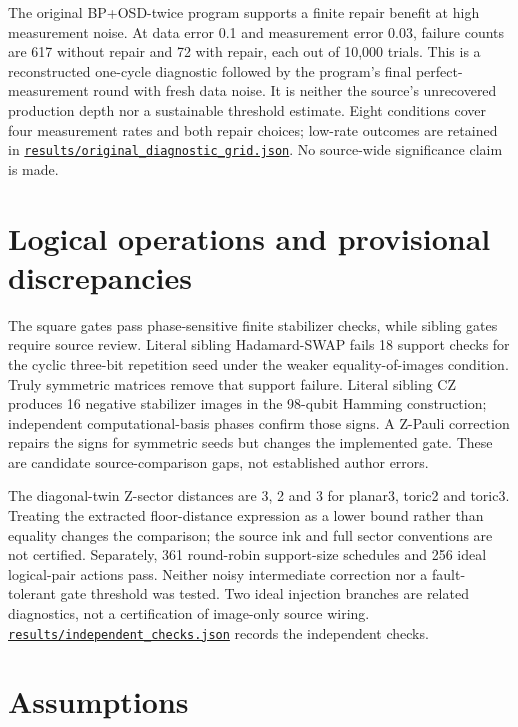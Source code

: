 \documentclass[11pt]{article}
\begin{document}
The original BP+OSD-twice program supports a finite repair benefit at high measurement noise. At data error 0.1 and measurement error 0.03, failure counts are 617 without repair and 72 with repair, each out of 10,000 trials. This is a reconstructed one-cycle diagnostic followed by the program's final perfect-measurement round with fresh data noise. It is neither the source's unrecovered production depth nor a sustainable threshold estimate. Eight conditions cover four measurement rates and both repair choices; low-rate outcomes are retained in \href{https://github.com/alectionary/vibe-math/blob/master/formalization/quintavalle-hgp/results/original_diagnostic_grid.json}{\nolinkurl{results/original_diagnostic_grid.json}}. No source-wide significance claim is made.

\section{Logical operations and provisional discrepancies}
The square gates pass phase-sensitive finite stabilizer checks, while sibling gates require source review. Literal sibling Hadamard-SWAP fails 18 support checks for the cyclic three-bit repetition seed under the weaker equality-of-images condition. Truly symmetric matrices remove that support failure. Literal sibling CZ produces 16 negative stabilizer images in the 98-qubit Hamming construction; independent computational-basis phases confirm those signs. A Z-Pauli correction repairs the signs for symmetric seeds but changes the implemented gate. These are candidate source-comparison gaps, not established author errors.

The diagonal-twin Z-sector distances are 3, 2 and 3 for planar3, toric2 and toric3. Treating the extracted floor-distance expression as a lower bound rather than equality changes the comparison; the source ink and full sector conventions are not certified. Separately, 361 round-robin support-size schedules and 256 ideal logical-pair actions pass. Neither noisy intermediate correction nor a fault-tolerant gate threshold was tested. Two ideal injection branches are related diagnostics, not a certification of image-only source wiring. \href{https://github.com/alectionary/vibe-math/blob/master/formalization/quintavalle-hgp/results/independent_checks.json}{\nolinkurl{results/independent_checks.json}} records the independent checks.

\section{Assumptions}
\end{document}
